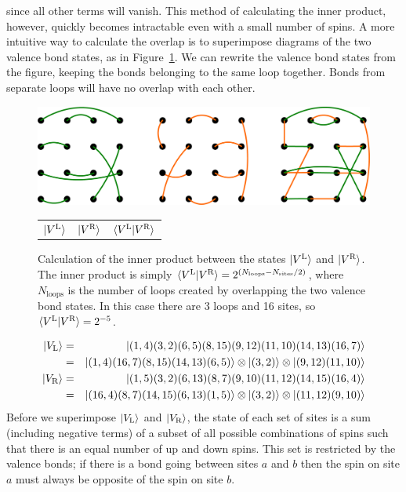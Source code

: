 since all other terms will vanish.  
This method of calculating the inner product, however, quickly becomes intractable even with a small number of spins.
A more intuitive way to calculate the overlap is to superimpose diagrams of the two valence bond states, as in Figure~\ref{overlap}.
We can rewrite the valence bond states from the figure, keeping the bonds belonging to the same 
loop together.  Bonds from separate loops will have no overlap with each other.
\begin{figure} {  
\centering
\includegraphics [width=5.5in]{./figures/made/overlap.pdf} 
\begin{tabular*}{5.5in}{ccc}
\hspace{12mm}$\lvert {V^\text{L}} \rangle$& 
\hspace{39mm}$\lvert {V^\text{R}} \rangle$ \hspace{40mm}& 
\hspace{33mm}$\langle {V^\text{L}} \rvert V^\text{R} \rangle$ \hspace{5mm}\\
\end{tabular*}
 \caption[Illustration of valence bond state inner product calculation]{
 Calculation of the inner product between the states $\lvert {V^\text{L}} \rangle$ and $\lvert {V^\text{R}} \rangle$.
 The inner product is simply 
 $\langle {V^\text{L}} \rvert V^\text{R} \rangle = 2^{(N_{\text{loops}}-N_{\text{sites}}/2)}$, 
 where $N_{\text{loops}}$ is the number of loops created by overlapping the 
 two valence bond states.
 In this case there are 3 loops and 16 sites, so 
 $\langle {V^\text{L}} \rvert V^\text{R} \rangle = 2^{-5}$.
 }
 \label{overlap}
 }
\end{figure}
\begin{eqnarray}
\lvert {V_\text{L}} \rangle &=&  \lvert {(1,4)(3,2)(6,5)(8,15)(9,12)(11,10)(14,13)(16,7)} \rangle\nonumber\\ 
			&=&  \lvert {(1,4)(16,7)(8,15)(14,13)(6,5)} \rangle\otimes\lvert {(3,2)} \rangle\otimes\lvert {(9,12)(11,10)} \rangle\\
\lvert {V_\text{R}} \rangle &=& \lvert {(1,5)(3,2)(6,13)(8,7)(9,10)(11,12)(14,15)(16,4)} \rangle\nonumber\\
			&=& \lvert {(16,4)(8,7)(14,15)(6,13)(1,5)} \rangle\otimes\lvert {(3,2)} \rangle\otimes\lvert {(11,12)(9,10)} \rangle
\end{eqnarray}
Before we superimpose $\lvert {V_\text{L}} \rangle$ and $\lvert {V_\text{R}} \rangle$, the state of each set of sites
is a sum (including negative terms) of a subset of all possible combinations of spins such that there is an equal number of up and down spins.  This set is restricted by the valence bonds; if there is a bond going between sites $a$ and $b$ then the spin on site $a$ must always be opposite of the spin on site $b$.  

